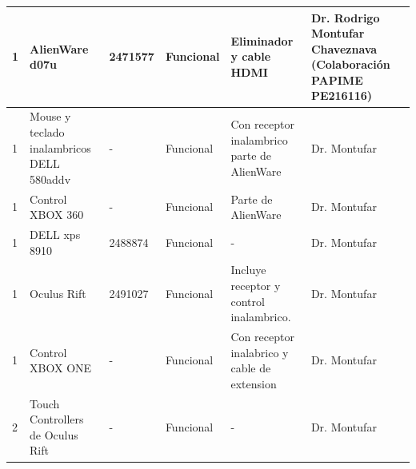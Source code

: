 \documentclass[a4paper,11pt]{article}                 %
\begin{document}
\begin{longtable}{|p{}|p{}|p{}|p{}|p{}|p{}|}
1                          & AlienWare d07u                            & 2471577                                                                      & Funcional                & Eliminador y cable HDMI                                                    & Dr. Rodrigo Montufar Chaveznava (Colaboración PAPIME PE216116)                    \\ \hline
1                          & Mouse y teclado inalambricos DELL 580addv & -                                                                            & Funcional                & Con receptor inalambrico parte de AlienWare                                & Dr. Montufar                                                                      \\ \hline
1                          & Control XBOX 360                          & -                                                                            & Funcional                & Parte de AlienWare                                                         & Dr. Montufar                                                                      \\ \hline
1                          & DELL xps 8910                             & 2488874                                                                      & Funcional                & -                                                                          & Dr. Montufar                                                                      \\ \hline
1                          & Oculus Rift                               & 2491027                                                                      & Funcional                & Incluye receptor y control inalambrico.                                    & Dr. Montufar                                                                      \\ \hline
1                          & Control XBOX ONE                          & -                                                                            & Funcional                & Con receptor inalabrico y cable de extension                               & Dr. Montufar                                                                      \\ \hline
2                          & Touch Controllers de Oculus Rift          & -                                                                            & Funcional                & -                                                                          & Dr. Montufar                                                                      \\ \hline

\end{longtable}
\end{document}
